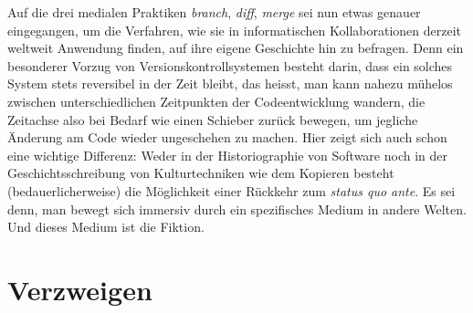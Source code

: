 \documentclass[a4paper,12pt]{article}
\begin{document}
Auf die drei medialen Praktiken \emph{branch}, \emph{diff}, \emph{merge} sei nun etwas genauer eingegangen, um die Verfahren, wie sie in informatischen Kollaborationen derzeit weltweit Anwendung finden, auf ihre eigene Geschichte hin zu befragen. Denn ein besonderer Vorzug von Versionskontrollsystemen besteht darin, dass ein solches System stets reversibel in der Zeit bleibt, das heisst, man kann nahezu mühelos zwischen unterschiedlichen Zeitpunkten der Codeentwicklung wandern, die Zeitachse also bei Bedarf wie einen Schieber zurück bewegen, um jegliche Änderung am Code wieder ungeschehen zu machen. Hier zeigt sich auch schon eine wichtige Differenz: Weder in der Historiographie von Software noch in der Geschichtsschreibung von Kulturtechniken wie dem Kopieren besteht (bedauerlicherweise) die Möglichkeit einer Rückkehr zum \emph{status quo ante}. Es sei denn, man bewegt sich immersiv durch ein spezifisches Medium in andere Welten. Und dieses Medium ist die Fiktion.

\begin{comment}

Von der kurzen Geschichte der Sofware zur langen Geschichte der kollektiven Autorschaft. 

Konfliktlösung
Vorteil: Das Zurückgehen in der Zeit. 

Graphentheoretische Darstellung. Beispiel. Briefroman Gefährliche Liebschaften
Source Control. Kontrolle behalten über die Quellen. 

Kurze Erklärung anhand von \verb+https://en.wikipedia.org/wiki/Version_control+


Interessant: Statt single und zentralisiert, gibt's das System noch als \verb+https://en.wikipedia.org/wiki/Distributed_version_control+

\verb+https://en.wikipedia.org/wiki/Comparison_of_version_control_software#History_and_adoption+

\end{comment}


\section{Verzweigen}
\end{document}
